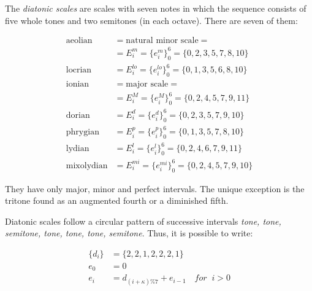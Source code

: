 The \emph{diatonic scales} are scales with seven notes in which the sequence consists of five whole tones and two semitones (in each octave). There are seven of them:

\begin{equation}\label{eq:escalas}
\begin{split}
\text{aeolian}    & = \text{natural minor scale} = \\
                  & = E_i^m = \{e_i^m\}_0^6 = \{0,2,3,5,7,8,10\} \\
\text{locrian}    & = E_i^{lo} = \{e_i^{lo}\}_0^6 = \{0,1,3,5,6,8,10\} \\ 
\text{ionian}     & = \text{major scale} =  \\
                       & = E_i^M = \{e_i^M\}_0^6 = \{0,2,4,5,7,9,11\} \\
\text{dorian}     & = E_i^{d} = \{e_i^{d}\}_0^6 = \{0,2,3,5,7,9,10\} \\
\text{phrygian}   & = E_i^{p} = \{e_i^{p}\}_0^6 = \{0,1,3,5,7,8,10\} \\
\text{lydian}     & = E_i^{l}=\{e_i^{l}\}_0^6 = \{0,2,4,6,7,9,11\} \\
\text{mixolydian} & = E_i^{mi} = \{e_i^{mi}\}_0^6 = \{0,2,4,5,7,9,10\}
\end{split}
\end{equation}

\noindent They have only major, minor and perfect intervals.
The unique exception is the tritone found as an augmented fourth or a diminished fifth.

Diatonic scales follow a circular pattern of successive intervals \textit{tone, tone, semitone, tone, tone, tone, semitone}. Thus, it is possible to write:

\begin{equation}\label{eq:relacaoDia}
\begin{split}
\{d_i\} & =\{2,2,1,2,2,2,1\} \\
e_0 & =0 \\
e_i & =d_{(i+\kappa)\%7}+e_{i-1} \quad for \;\;  i > 0
\end{split}
\end{equation}


